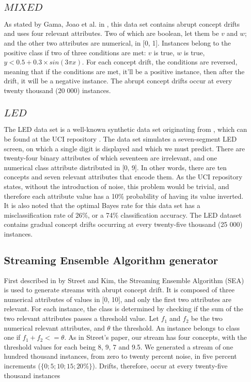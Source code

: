\subsection{$MIXED$}
As stated by Gama, Joao et al. in \cite{gama2004learning}, this data set contains abrupt concept drifts and uses four relevant attributes. Two of which are boolean, let them be $v$ and $w$; and the other two attributes are numerical, in [0, 1]. Instances belong to the positive class if two of three conditions are met: $v$ is true, $w$ is true, $y < 0.5 + 0.3 \times sin(3\pi x)$. For each concept drift, the conditions are reversed, meaning that if the conditions are met, it'll be a positive instance, then after the drift, it will be a negative instance. The abrupt concept drifts occur at every twenty thousand (20 000) instances.

\subsection{$LED$}
The LED data set is a well-known synthetic data set originating from \cite{breiman1984classification}, which can be found at the UCI repository \cite{blake1999uci}. The data set simulates a seven-segment LED screen, on which a single digit is displayed and which we must predict. There are twenty-four binary attributes of which seventeen are irrelevant, and one numerical class attribute distributed in [0, 9]. In other words, there are ten concepts and seven relevant attributes that encode them. As the UCI repository states, without the introduction of noise, this problem would be trivial, and therefore each attribute value has a 10\% probability of having its value inverted. It is also noted that the optimal Bayes rate for this data set has a misclassification rate of 26\%, or a 74\% classification accuracy. The LED dataset contains gradual concept drifts occurring at every twenty-five thousand (25 000) instances.

\subsection{Streaming Ensemble Algorithm generator}
First described in \cite{street2001streaming} by Street and Kim, the Streaming Ensemble Algorithm (SEA) is used to generate streams with abrupt concept drift. It is composed of three numerical attributes of values in [0, 10], and only the first two attributes are relevant. For each instance, the class is determined by checking if the sum of the two relevant attributes passes a threshold value. Let $f_1$ and $f_2$ be the two numerical relevant attributes, and $\theta$ the threshold. An instance belongs to class one if $f_1 + f_2 <= \theta$. As in Street's paper, our stream has four concepts, with the threshold values for each being 8, 9, 7 and 9.5. We generated a stream of one hundred thousand instances, from zero to twenty percent noise, in five percent increments ($\{0; 5; 10; 15; 20\%\}$). Drifts, therefore, occur at every twenty-five thousand instances

